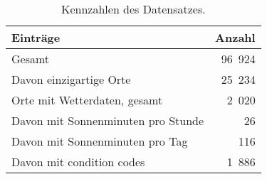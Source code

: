 \begin{table}[t]
    \caption{Kennzahlen des Datensatzes.}
    \label{tab:data}
    \centering
    \small
    \begin{tabular}{l r}
        \toprule
        Einträge & Anzahl\\
        \midrule
        Gesamt & 96~924\\
        Davon einzigartige Orte & 25~234\\
        \midrule
        Orte mit Wetterdaten, gesamt & 2~020\\
        Davon mit Sonnenminuten pro Stunde & 26\\
        Davon mit Sonnenminuten pro Tag & 116\\
        Davon mit condition codes & 1~886\\
        \bottomrule
    \end{tabular}
\end{table}